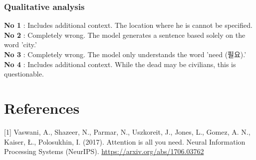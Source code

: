 \documentclass{article}
\begin{document}
\subsubsection{Qualitative analysis}
\textbf{No 1} : Includes additional context. The location where he is cannot be specified. \\
\textbf{No 2} : Completely wrong. The model generates a sentence based solely on the word 'city.' \\
\textbf{No 3} : Completely wrong.  The model only understands the word 'need (필요).' \\
\textbf{No 4} : Includes additional context. While the dead may be civilians, this is questionable.\\





\section*{References}

{
\small

[1] Vaswani, A., Shazeer, N., Parmar, N., Uszkoreit, J., Jones, L., Gomez, A. N., Kaiser, Ł., Polosukhin, I. (2017). Attention is all you need. Neural Information Processing Systems (NeurIPS). \url{https://arxiv.org/abs/1706.03762}

}

\end{document}
